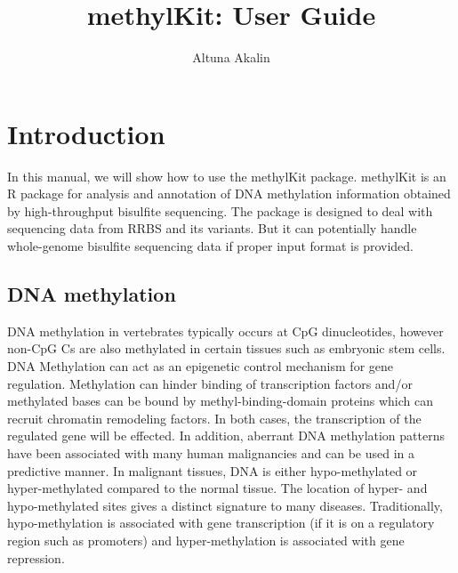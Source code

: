 \documentclass{article}
\title{ methylKit: User Guide}
\author{Altuna Akalin}
\begin{document}
% 





\maketitle

\tableofcontents


\section{Introduction}
In this manual, we will show how to use the methylKit package. methylKit is an R package for analysis and annotation of DNA methylation information obtained by high-throughput bisulfite sequencing. The package is designed to deal with sequencing data from RRBS and its variants. But it can potentially handle whole-genome bisulfite sequencing data if proper input format is provided. 

\subsection{DNA methylation}
DNA methylation in vertebrates typically occurs at CpG dinucleotides, however non-CpG Cs are also methylated in certain tissues such as embryonic stem cells. DNA Methylation can act as an epigenetic control mechanism for gene regulation. Methylation can hinder binding of transcription factors and/or methylated bases can be bound by methyl-binding-domain proteins which can recruit chromatin remodeling factors. In both cases, the transcription of the regulated gene will be effected. In addition, aberrant DNA methylation patterns have been associated with many human malignancies and can be used in a predictive manner. In malignant tissues, DNA is either hypo-methylated or hyper-methylated compared to the normal tissue. The location of hyper- and hypo-methylated sites gives a distinct signature to many diseases. Traditionally, hypo-methylation is associated with gene transcription (if it is on a regulatory region such as promoters) and hyper-methylation is associated with gene repression.
\end{document}
